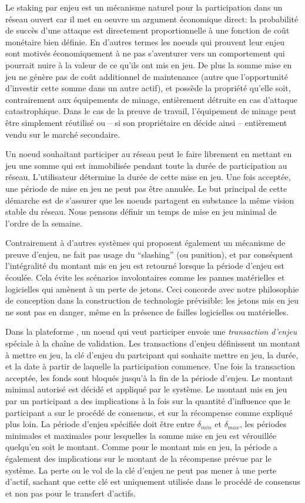 \documentclass[runningheads]{llncs}
\begin{document}
Le staking par enjeu est un mécanisme naturel pour la participation dans un réseau ouvert car il met en oeuvre un
argument économique direct: la probabilité de succès d'une attaque est directement proportionnelle à une fonction de
coût monétaire bien définie. En d'autres termes les noeuds qui prouvent leur enjeu sont motivés économiquement à ne pas
s'aventurer vers un comportement qui pourrait nuire à la valeur de ce qu'ils ont mis en jeu. De plus la somme mise en
jeu ne génère pas de coût additionnel de maintenance (autre que l'opportunité d'investir cette somme dans un autre
actif), et possède la propriété qu'elle soit, contrairement aux équipements de minage, entièrement détruite en cas
d'attaque catastrophique. Dans le cas de la preuve de travail, l'équipement de minage peut être simplement réutilisé ou
-- si son propriétaire en décide ainsi -- entièrement vendu sur le marché secondaire.

Un noeud souhaitant participer au réseau peut le faire librement en mettant en jeu une somme qui est immobilisée pendant
toute la durée de participation au réseau. L'utilisateur détermine la durée de cette mise en jeu. Une fois acceptée, une
période de mise en jeu ne peut pas être annulée. Le but principal de cette démarche est de s'assurer que les noeuds
partagent en substance la même vision stable du réseau. Nous pensons définir un temps de mise en jeu minimal de l'ordre
de la semaine.

Contrairement à d'autres systèmes qui proposent également un mécanisme de preuve d'enjeu, \AVATokenName{} ne fait pas
usage du ``slashing'' (ou punition), et par conséquent l'intégralité du montant mis en jeu est retourné lorsque la
période d'enjeu est écoulée. Cela évite les scénarios involontaires comme les pannes matérielles et logicielles qui
amènent à un perte de jetons. Ceci concorde avec notre philosophie de conception dans la construction de technologie
prévisible: les jetons mis en jeu ne sont pas en danger, même en la présence de failles logicielles ou matérielles.

Dans la plateforme \AVAPlatformName, un noeud qui veut participer envoie une \emph{transaction d'enjeu} spéciale à la
chaîne de validation. Les transactions d'enjeu définissent un montant à mettre en jeu, la clé d'enjeu du partcipant qui
souhaite mettre en jeu, la durée, et la date à partir de laquelle la participation commence. Une fois la transaction
acceptée, les fonds sont bloqués jusqu'à la fin de la période d'enjeu. Le montant minimal autorisé est décidé et
appliqué par le système. Le montant mis en jeu par un participant a des implications à la fois sur la quantité
d'influence que le participant a sur le procédé de consensus, et sur la récompense comme expliqué plus loin.
La période d'enjeu spécifiée doit être entre $\delta_{min}$ et $\delta_{max}$, les périodes minimales et maximales pour
lesquelles la somme mise en jeu est vérouillée quelqu'en soit le montant. Comme pour le montant mis en jeu, la période
a également des implications sur le montant de la récompense prévue par le système. La perte ou le vol de la clé
d'enjeu ne peut pas mener à une perte d'actif, sachant que cette clé est uniquement utilisée dans le procédé de
consensus et non pas pour le transfert d'actifs.
\end{document}
